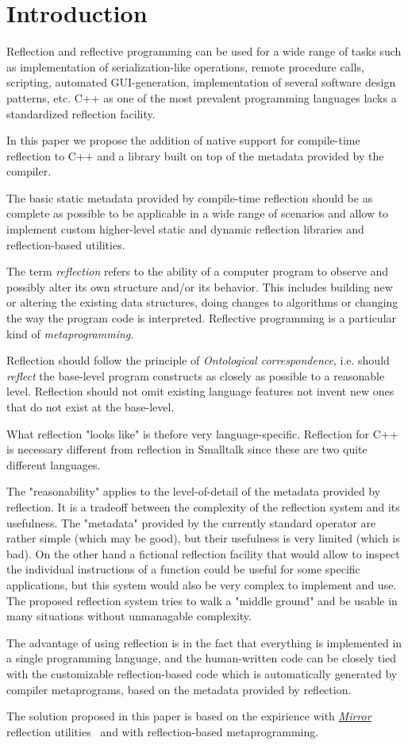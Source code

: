 \section{Introduction}

Reflection and reflective programming can be used
for a wide range of tasks such as implementation of serialization-like operations,
remote procedure calls, scripting, automated GUI-generation,
implementation of several software design patterns, etc.
C++ as one of the most prevalent programming languages 
lacks a standardized reflection facility.

In this paper we propose the addition of native support for
compile-time reflection to C++ and a library built
on top of the metadata provided by the compiler.

The basic static metadata provided by compile-time reflection
should be as complete as possible to be applicable in a wide
range of scenarios and allow to implement custom higher-level
static and dynamic reflection libraries and reflection-based
utilities.

The term \emph{reflection} refers to the ability of a computer program
to observe and possibly alter its own structure and/or its behavior.
This includes building new or altering the existing data structures,
doing changes to algorithms or changing the way the program code
is interpreted. Reflective programming is a particular kind
of \emph{metaprogramming}.

Reflection should follow the principle of {\em Ontological correspondence},
i.e. should {\em reflect} the base-level program constructs as closely
as possible to a reasonable level.
Reflection should not omit existing language features not invent new
ones that do not exist at the base-level.

What reflection "looks like" is thefore very language-specific.
Reflection for C++ is necessary different from reflection in Smalltalk
since these are two quite different languages.

The "reasonability" applies to the level-of-detail of the metadata
provided by reflection. It is a tradeoff between the complexity
of the reflection system and its usefulness. The "metadata" provided
by the currently standard \verb@typeid@ operator are rather simple
(which may be good), but their usefulness is very limited (which
is bad). On the other hand a fictional reflection facility that would
allow to inspect the individual instructions of a function could
be useful for some specific applications, but this system would
also be very complex to implement and use.
The proposed reflection system tries to walk a "middle ground"
and be usable in many situations without unmanagable complexity.

The advantage of using reflection is in the fact that everything
is implemented in a single programming language, and the human-written
code can be closely tied with the customizable reflection-based
code which is automatically generated by compiler metaprograms,
based on the metadata provided by reflection.

The solution proposed in this paper is based on the expirience with
\href{http://kifri.fri.uniza.sk/~chochlik/mirror-lib/html/}{\em Mirror}
reflection utilities~\cite{mirror-doc-cpp11} and with reflection-based
metaprogramming.
